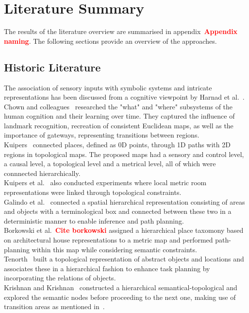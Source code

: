 \documentclass[twocolumn,letterpaper]{IEEEAerospaceCLS}  %
\newcommand\todo[1]{\textbf{\textcolor{red}{#1}}}
\begin{document}
\section{Literature Summary} \label{sec:Lit}
The results of the literature overview are summarised in appendix~\todo{Appendix naming}. The following sections provide an overview of the approaches.

\subsection{Historic Literature} \label{subsec:LitHist}
The association of sensory inputs with symbolic systems and intricate representations has been discussed from a cognitive viewpoint by Harnad et al.~\cite{harnad_symbol_1990}.\\
Chown and colleagues~\cite{chown_prototypes_1995} researched the "what" and "where" subsystems of the human cognition and their learning over time. They captured the influence of landmark recognition, recreation of consistent Euclidean maps, as well as the importance of gateways, representing transitions between regions.\\
Kuipers~\cite{kuipers_spatial_2000} connected places, defined as 0D points, through 1D paths with 2D regions in topological maps. The proposed maps had a sensory and control level, a causal level, a topological level and a metrical level, all of which were connnected hierarchically.\\ Kuipers et al.~\cite{kuipers_local_2004} also conducted experiments where local metric room representations were linked through topological constraints.\\ 
Galindo et al.~\cite{galindo_robot_2008} connected a spatial hierarchical representation consisting of areas and objects with a terminological box and connected between these two in a deterministic manner to enable inference and path planning.\\
Borkowski et al.~\todo{Cite borkowski} assigned a hierarchical place taxomony based on architectural house representations to a metric map and performed path-planning within this map while considering semantic constraints.\\
Tenorth~\cite{tenorth_knowrob-map_2010} built a topological representation of abstract objects and locations and associates these in a hierarchical fashion to enhance task planning by incorporating the relations of objects.\\
Krishnan and Krishnan~\cite{krishnan_visual_2010} constructed a hierarchical semantical-topological and explored the semantic nodes before proceeding to the next one, making use of transition areas as mentioned in~\cite{chown_prototypes_1995}.
\end{document}
